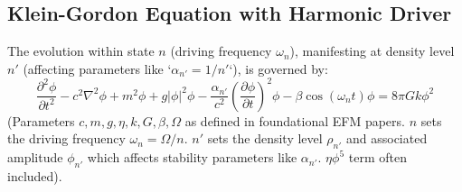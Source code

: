 \documentclass[11pt]{article}
\begin{document}
\subsection{Klein-Gordon Equation with Harmonic Driver} %
The evolution within state \(n\) (driving frequency \(\omega_n\)), manifesting at density level \(n'\) (affecting parameters like `\(\alpha_{n'}=1/n'\)`), is governed by:
\begin{equation}
\frac{\partial^2 \phi}{\partial t^2} - c^2 \nabla^2 \phi + m^2 \phi + g |\phi|^2 \phi - \frac{\alpha_{n'}}{c^2} \left(\frac{\partial \phi}{\partial t}\right)^2 \phi - \beta \cos\left(\omega_n t\right) \phi = 8\pi G k \phi^2
\label{eq:kge_harmonic}
\end{equation}
(Parameters \(c, m, g, \eta, k, G, \beta, \Omega\) as defined in foundational EFM papers. \(n\) sets the driving frequency \(\omega_n=\Omega/n\). \(n'\) sets the density level \(\rho_{n'}\) and associated amplitude \(\phi_{n'}\) which affects stability parameters like \(\alpha_{n'}\). \(\eta\phi^5\) term often included).
\end{document}
